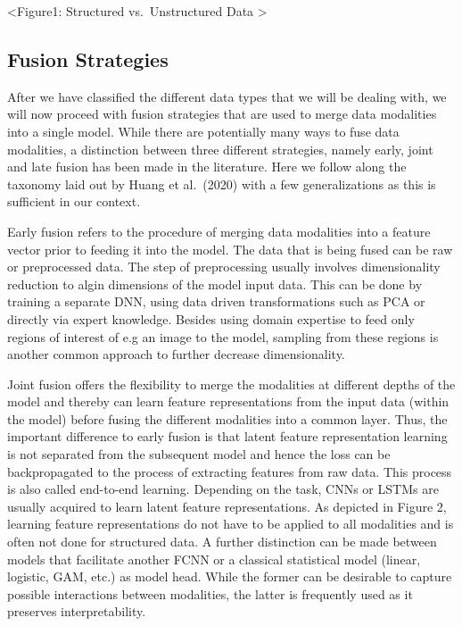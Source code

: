 \documentclass[
]{krantz}
\begin{document}
\textless Figure1: Structured vs.~Unstructured Data \textgreater{}

\hypertarget{fusion-strategies}{%
\subsection{Fusion Strategies}\label{fusion-strategies}}

After we have classified the different data types that we will be dealing with, we will now proceed with fusion strategies that are used to merge data modalities into a single model. While there are potentially many ways to fuse data modalities, a distinction between three different strategies, namely early, joint and late fusion has been made in the literature. Here we follow along the taxonomy laid out by Huang et al.~(2020) with a few generalizations as this is sufficient in our context.

Early fusion refers to the procedure of merging data modalities into a feature vector prior to feeding it into the model. The data that is being fused can be raw or preprocessed data. The step of preprocessing usually involves dimensionality reduction to algin dimensions of the model input data. This can be done by training a separate DNN, using data driven transformations such as PCA or directly via expert knowledge. Besides using domain expertise to feed only regions of interest of e.g an image to the model, sampling from these regions is another common approach to further decrease dimensionality.

Joint fusion offers the flexibility to merge the modalities at different depths of the model and thereby can learn feature representations from the input data (within the model) before fusing the different modalities into a common layer. Thus, the important difference to early fusion is that latent feature representation learning is not separated from the subsequent model and hence the loss can be backpropagated to the process of extracting features from raw data. This process is also called end-to-end learning. Depending on the task, CNNs or LSTMs are usually acquired to learn latent feature representations. As depicted in Figure 2, learning feature representations do not have to be applied to all modalities and is often not done for structured data. A further distinction can be made between models that facilitate another FCNN or a classical statistical model (linear, logistic, GAM, etc.) as model head. While the former can be desirable to capture possible interactions between modalities, the latter is frequently used as it preserves interpretability.
\end{document}
